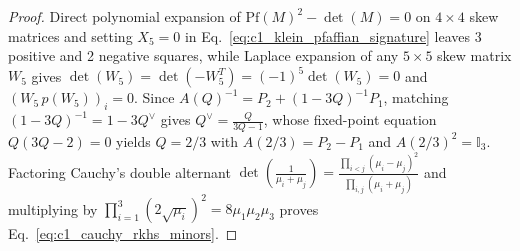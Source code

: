 \documentclass[11pt,a4paper]{article}
\theoremstyle{definition}
\theoremstyle{plain}
\theoremstyle{remark}
\begin{document}
\begin{proof}
Direct polynomial expansion of $\mathrm{Pf}(M)^2 - \det(M) = 0$ on $4\times 4$ skew matrices and setting $X_5 = 0$ in Eq.~\eqref{eq:c1_klein_pfaffian_signature} leaves 3 positive and 2 negative squares, while Laplace expansion of any $5\times 5$ skew matrix $W_5$ gives $\det(W_5) = \det(-W_5^T) = (-1)^5\det(W_5) = 0$ and $(W_5\,p(W_5))_i = 0$. Since $A(Q)^{-1} = P_2 + (1 - 3Q)^{-1}P_1$, matching $(1 - 3Q)^{-1} = 1 - 3Q^\vee$ gives $Q^\vee = \frac{Q}{3Q - 1}$, whose fixed-point equation $Q(3Q - 2) = 0$ yields $Q = 2/3$ with $A(2/3) = P_2 - P_1$ and $A(2/3)^2 = \mathbb{I}_3$. Factoring Cauchy's double alternant $\det\!\left(\frac{1}{\mu_i + \mu_j}\right) = \frac{\prod_{i<j}(\mu_i - \mu_j)^2}{\prod_{i,j}(\mu_i + \mu_j)}$ and multiplying by $\prod_{i=1}^3(2\sqrt{\mu_i})^2 = 8\mu_1\mu_2\mu_3$ proves Eq.~\eqref{eq:c1_cauchy_rkhs_minors}.
\end{proof}
\end{document}
